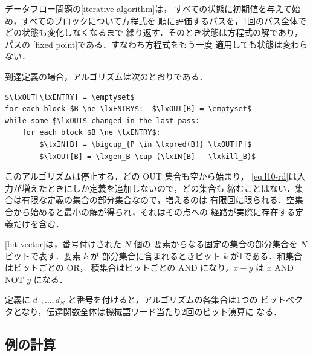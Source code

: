 \documentclass[../main.tex]{subfiles}
\begin{document}
\begin{definition}
  データフロー問題の[iterative algorithm]は，
  すべての状態に初期値を与えて始め，すべてのブロックについて方程式を
  順に評価するパスを，1回のパス全体でどの状態も変化しなくなるまで
  繰り返す．そのとき状態は方程式の解であり，パスの
  [fixed point]である．すなわち方程式をもう一度
  適用しても状態は変わらない．
\end{definition}

到達定義の場合，アルゴリズムは次のとおりである．
\begin{lstlisting}[mathescape, numbers=none]
$\lxOUT[\lxENTRY] = \emptyset$
for each block $B \ne \lxENTRY$:  $\lxOUT[B] = \emptyset$
while some $\lxOUT$ changed in the last pass:
    for each block $B \ne \lxENTRY$:
        $\lxIN[B] = \bigcup_{P \in \lxpred(B)} \lxOUT[P]$
        $\lxOUT[B] = \lxgen_B \cup (\lxIN[B] - \lxkill_B)$
\end{lstlisting}

このアルゴリズムは停止する．どの $\mathrm{OUT}$ 集合も空から始まり，
\cref{eq:l10-rd}は入力が増えたときにしか定義を追加しないので，どの集合も
縮むことはない．集合は有限な定義の集合の部分集合なので，増えるのは
有限回に限られる．空集合から始めると最小の解が得られ，それはその点への
経路が実際に存在する定義だけを含む．

\begin{definition}[ビットベクタ]
  [bit vector]は，番号付けされた $N$ 個の
  要素からなる固定の集合の部分集合を $N$ ビットで表す．要素 $k$ が
  部分集合に含まれるときビット $k$ が1である．和集合はビットごとの OR，
  積集合はビットごとの AND になり，$x-y$ は $x$ AND NOT $y$ になる．
\end{definition}

定義に $d_1,\dots,d_N$ と番号を付けると，アルゴリズムの各集合は1つの
ビットベクタとなり，伝達関数全体は機械語ワード当たり2回のビット演算に
なる．

\subsection{例の計算}
\end{document}
